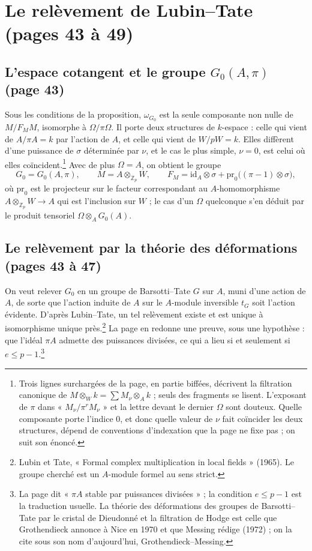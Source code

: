 \documentclass[11pt,a4paper]{article}
\begin{document}
\section*{Le relèvement de Lubin--Tate (pages 43 à 49)}

\subsection*{L'espace cotangent et le groupe $G_{0}(A, \pi)$ (page 43)}

Sous les conditions de la proposition, $\omega_{G_{0}}$ est la seule
composante non nulle de $M/F_{M}M$, isomorphe à $\Omega/\pi\Omega$. Il porte
deux structures de $k$-espace : celle qui vient de $A/\pi A = k$ par
l'action de $A$, et celle qui vient de $W/pW = k$. Elles diffèrent d'une
puissance de $\sigma$ déterminée par $\nu$, et le cas le plus simple, $\nu =
0$, est celui où elles coïncident.\footnote{Trois lignes surchargées de la
page, en partie biffées, décrivent la filtration canonique de
$M \otimes_{W} k = \sum M_{\nu} \otimes_{A} k$ ; seuls des fragments se
lisent. L'exposant de $\pi$ dans « $M_{\nu}/\pi^{r}M_{\nu}$ » et la lettre
devant le dernier $\Omega$ sont douteux. Quelle composante porte l'indice 0,
et donc quelle valeur de $\nu$ fait coïncider les deux structures, dépend de
conventions d'indexation que la page ne fixe pas ; on suit son énoncé.} Avec
de plus $\Omega = A$, on obtient le groupe
\[
G_{0} = G_{0}(A, \pi), \qquad M = A \otimes_{\mathbb{Z}_{p}} W, \qquad
F_{M} = \mathrm{id}_{A} \otimes \sigma + \mathrm{pr}_{0}\bigl((\pi - 1)
\otimes \sigma\bigr),
\]
où $\mathrm{pr}_{0}$ est le projecteur sur le facteur correspondant au
$A$-homomorphisme $A \otimes_{\mathbb{Z}_{p}} W \to A$ qui est l'inclusion
sur $W$ ; le cas d'un $\Omega$ quelconque s'en déduit par le produit
tensoriel $\Omega \otimes_{A} G_{0}(A)$.

\subsection*{Le relèvement par la théorie des déformations (pages 43 à 47)}

On veut relever $G_{0}$ en un groupe de Barsotti--Tate $G$ sur $A$, muni
d'une action de $A$, de sorte que l'action induite de $A$ sur le $A$-module
inversible $t_{G}$ soit l'action évidente. D'après Lubin--Tate, un tel
relèvement existe et est unique à isomorphisme unique près.\footnote{Lubin
et Tate, « Formal complex multiplication in local fields » (1965). Le groupe
cherché est un $A$-module formel au sens strict.} La page en redonne une
preuve, sous une hypothèse : que l'idéal $\pi A$ admette des puissances
divisées, ce qui a lieu si et seulement si $e \le p-1$.\footnote{La page dit
« $\pi A$ stable par puissances divisées » ; la condition $e \le p - 1$ est la
traduction usuelle. La théorie des déformations des groupes de
Barsotti--Tate par le cristal de Dieudonné et la filtration de Hodge est
celle que Grothendieck annonce à Nice en 1970 et que Messing rédige (1972) ;
on la cite sous son nom d'aujourd'hui, Grothendieck--Messing.}
\end{document}
